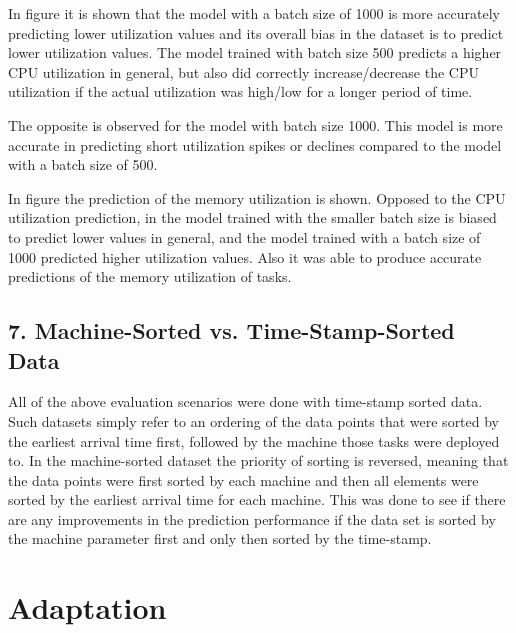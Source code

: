   


  In figure 
   it is shown that the model with a batch size of 1000 is more accurately predicting lower utilization values and its overall bias in the dataset is to predict lower utilization values.
  The model trained with batch size 500 predicts a higher CPU utilization in general, but also did correctly increase/decrease the CPU utilization if the actual utilization was high/low for a longer period of time.

  The opposite is observed for the model with batch size 1000. 
  This model is more accurate in predicting short utilization spikes or declines compared to the model with a batch size of 500.
  


  In figure 
  the prediction of the memory utilization is shown.
  Opposed to the CPU utilization prediction, in the model trained with the smaller batch size is biased to predict lower values in general, and the model trained with a batch size of 1000 predicted higher utilization values. Also it was able to produce accurate predictions of the memory utilization of tasks.
  \subsection{7. Machine-Sorted vs. Time-Stamp-Sorted Data}
  \label{sec:machine-sorted-vs-time-stamp-sorted-data-evaluation-scenarios}

    All of the above evaluation scenarios were done with time-stamp sorted data. Such datasets simply refer to an ordering of the data points that were sorted by the earliest arrival time first, followed by the machine those tasks were deployed to.
    In the machine-sorted dataset the priority of sorting is reversed, meaning that the data points were first sorted by each machine and then all elements were sorted by the earliest arrival time for each machine. 
    This was done to see if there are any improvements in the prediction performance if the data set is sorted by the machine parameter first and only then sorted by the time-stamp.

    



\section{Adaptation}
